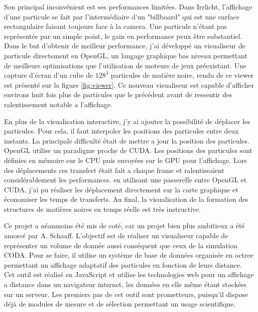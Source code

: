 Son principal inconvénient est ses performances limitées.
Dans Irrlicht, l'affichage d'une particule se fait par l'intermédiaire d'un "billboard" qui est une surface rectangulaire faisant toujours face à la camera.
Une particule n'étant pas représentée par un simple point, le gain en performance peux être substantiel.
Dans le but d'obtenir de meilleur performance, j'ai développé un visualiseur de particule directement en OpenGL, un langage graphique bas niveau permettant de meilleurs optimisations que l'utilisation de moteurs de jeux préexistant.
Une capture d'écran d'un cube de $128^3$ particules de matière noire, rendu de ce viewer est présenté sur la figure \ref{fig:viewer}.
Ce nouveau visualiseur est capable d'afficher environs huit fois plus de particules que le précédent avant de ressentir des ralentissement notable a l'affichage. 


En plus de la visualisation interactive, j'y ai ajouter la possibilité de déplacer les particules.
Pour cela, il faut interpoler les positions des particules entre deux instants.
La principale difficulté était de mettre a jour la position des particules.
OpenGL utilise un paradigme proche de CUDA.
Les positions des particules sont définies en mémoire sur le CPU puis envoyées sur le GPU pour l'affichage.
Lors des déplacements ces transfert était fait a chaque frame et ralentissaient considérablement les performances.
en utilisant une passerelle entre OpenGL et CUDA, j'ai pu réaliser les déplacement directement sur la carte graphique et économiser les temps de transferts.
Au final, la visualisation de la formation des structures de matières noires en temps réelle est très instructive.

Ce projet a néanmoins été mis de coté, car un projet bien plus ambitieux a été amorcé par A. Schaaff.
L'objectif est de réaliser un visualiseur capable de représenter un volume de donnée aussi conséquent que ceux de la simulation CODA.
Pour se faire, il utilise un système de base de données organisée en octree permettant un affichage adaptatif des particules en fonction de leurs distance.
Cet outil est réalisé en JavaScript et utilise les technologies web pour un affichage a distance dans un navigateur internet, les données en elle même étant stockées sur un serveur.
Les premiers pas de cet outil sont prometteurs, puisqu'il dispose déjà de modules de mesure et de sélection permettant un usage scientifique.


